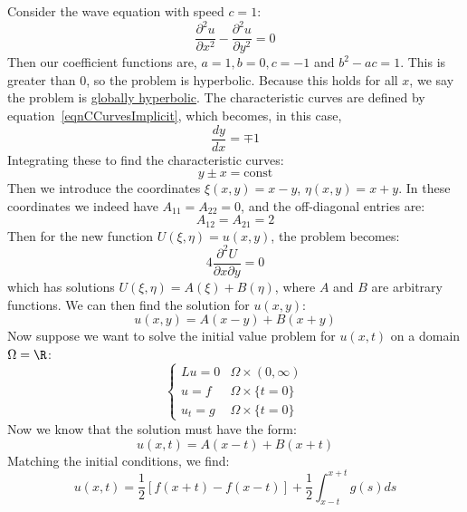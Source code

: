\documentclass[../Main.tex]{subfiles}
\begin{document}
\begin{example}
    Consider the wave equation with speed $c = 1$:
    \begin{equation*}
        \frac{\partial^{2}u}{\partial x^{2}} - \frac{\partial^{2}u}{\partial y^{2}} = 0
    \end{equation*}
    Then our coefficient functions are, $a = 1, b = 0, c = -1$ and $b^2 - ac = 1$. This is greater than $0$, so the problem is hyperbolic. Because this holds for all $x$, we say the problem is \underline{globally hyperbolic}. The characteristic curves are defined by equation~\ref{eqnCCurvesImplicit}, which becomes, in this case,
    \begin{equation*}
        \frac{dy}{dx} = \mp 1
    \end{equation*}
    Integrating these to find the characteristic curves:
    \begin{equation*}
        y \pm x = \text{const}
    \end{equation*}
    Then we introduce the coordinates $\xi(x, y) = x - y$, $\eta(x, y) = x + y$. In these coordinates we indeed have $A_{11} = A_{22} = 0$, and the off-diagonal entries are:
    \begin{equation*}
        A_{12} = A_{21} = 2
    \end{equation*}
    Then for the new function $U(\xi, \eta) = u(x, y)$, the problem becomes:
    \begin{equation*}
        4 \frac{\partial^{2}U}{\partial x\partial y} = 0
    \end{equation*}
    which has solutions $U(\xi, \eta) = A(\xi) + B(\eta)$, where $A$ and $B$ are arbitrary functions. We can then find the solution for $u(x, y)$:
    \begin{equation*}
        u(x, y) = A(x - y) + B(x + y)
    \end{equation*}
    Now suppose we want to solve the initial value problem for $u(x, t)$ on a domain $\Omega = \R$:
    \begin{equation*}
        \begin{cases}
            Lu = 0 & \Omega \times (0, \infty) \\
            u = f & \Omega \times \{t = 0\} \\
            u_t = g &\Omega \times \{t = 0\} 
        \end{cases}
    \end{equation*}
    Now we know that the solution must have the form:
    \begin{equation*}
        u(x, t) = A(x - t) + B(x + t)
    \end{equation*}
    Matching the initial conditions, we find:
    \begin{equation*}
        u(x, t) = \frac12 \left[f(x + t) - f(x - t)\right] + \frac12 \int_{x - t}^{x + t} g(s) ds 
    \end{equation*}
\end{example}
\end{document}
